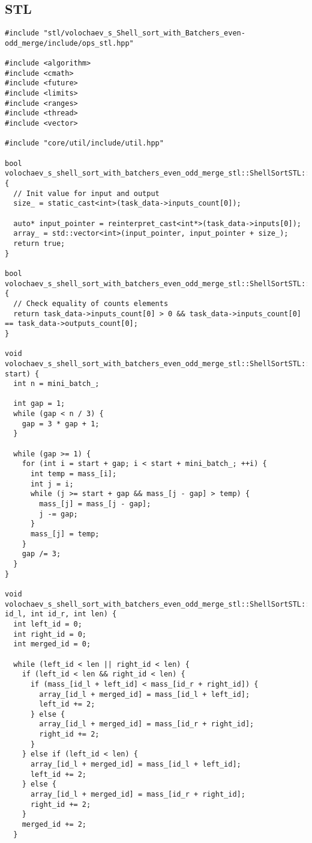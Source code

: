 \documentclass[12pt]{article}
\begin{document}
\subsection*{STL}
\begin{lstlisting}
#include "stl/volochaev_s_Shell_sort_with_Batchers_even-odd_merge/include/ops_stl.hpp"

#include <algorithm>
#include <cmath>
#include <future>
#include <limits>
#include <ranges>
#include <thread>
#include <vector>

#include "core/util/include/util.hpp"

bool volochaev_s_shell_sort_with_batchers_even_odd_merge_stl::ShellSortSTL::PreProcessingImpl() {
  // Init value for input and output
  size_ = static_cast<int>(task_data->inputs_count[0]);

  auto* input_pointer = reinterpret_cast<int*>(task_data->inputs[0]);
  array_ = std::vector<int>(input_pointer, input_pointer + size_);
  return true;
}

bool volochaev_s_shell_sort_with_batchers_even_odd_merge_stl::ShellSortSTL::ValidationImpl() {
  // Check equality of counts elements
  return task_data->inputs_count[0] > 0 && task_data->inputs_count[0] == task_data->outputs_count[0];
}

void volochaev_s_shell_sort_with_batchers_even_odd_merge_stl::ShellSortSTL::ShellSort(int start) {
  int n = mini_batch_;

  int gap = 1;
  while (gap < n / 3) {
    gap = 3 * gap + 1;
  }

  while (gap >= 1) {
    for (int i = start + gap; i < start + mini_batch_; ++i) {
      int temp = mass_[i];
      int j = i;
      while (j >= start + gap && mass_[j - gap] > temp) {
        mass_[j] = mass_[j - gap];
        j -= gap;
      }
      mass_[j] = temp;
    }
    gap /= 3;
  }
}

void volochaev_s_shell_sort_with_batchers_even_odd_merge_stl::ShellSortSTL::MergeBlocks(int id_l, int id_r, int len) {
  int left_id = 0;
  int right_id = 0;
  int merged_id = 0;

  while (left_id < len || right_id < len) {
    if (left_id < len && right_id < len) {
      if (mass_[id_l + left_id] < mass_[id_r + right_id]) {
        array_[id_l + merged_id] = mass_[id_l + left_id];
        left_id += 2;
      } else {
        array_[id_l + merged_id] = mass_[id_r + right_id];
        right_id += 2;
      }
    } else if (left_id < len) {
      array_[id_l + merged_id] = mass_[id_l + left_id];
      left_id += 2;
    } else {
      array_[id_l + merged_id] = mass_[id_r + right_id];
      right_id += 2;
    }
    merged_id += 2;
  }


\end{lstlisting}
\end{document}
